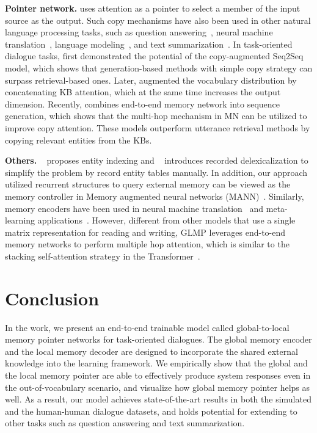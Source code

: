 \documentclass{article} \usepackage{iclr2019_conference,times}
\begin{document}
\textbf{Pointer network.}
\cite{vinyals2015pointer} uses attention as a pointer to select a member of the input source as the output. Such copy mechanisms have also been used in other natural language processing tasks, such as question answering~\citep{Dehghani2017, heEtAl2017Long1}, neural machine translation~\citep{gulcehreEtAl2016,guEtAl2016}, language modeling~\citep{merity2016pointer}, and text summarization~\citep{seeliumanning2017Long}. In task-oriented dialogue tasks, \cite{eric-manning:2017:EACLshort} first demonstrated the potential of the copy-augmented Seq2Seq model, which shows that generation-based methods with simple copy strategy can surpass retrieval-based ones. Later, \cite{ericKVR2017} augmented the vocabulary distribution by concatenating KB attention, which at the same time increases the output dimension. Recently, \cite{mem2seq} combines end-to-end memory network into sequence generation, which shows that the multi-hop mechanism in MN can be utilized to improve copy attention. These models outperform utterance retrieval methods by copying relevant entities from the KBs.

\textbf{Others.}
~\cite{zhao2017generative} proposes entity indexing and ~\cite{dqmem8461426} introduces recorded delexicalization to simplify the problem by record entity tables manually. In addition, our approach utilized recurrent structures to query external memory can be viewed as the memory controller in Memory augmented neural networks (MANN)~\citep{graves2014neural, graves2016hybrid}. Similarly, memory encoders have been used in neural machine translation~\citep{wangEtAl2016} and meta-learning applications~\citep{KaiserNRB17}. However, different from other models that use a single matrix representation for reading and writing, GLMP leverages end-to-end memory networks to perform multiple hop attention, which is similar to the stacking self-attention strategy in the Transformer~\citep{vaswani2017attention}. 


\section{Conclusion}
In the work, we present an end-to-end trainable model called global-to-local memory pointer networks for task-oriented dialogues. The global memory encoder and the local memory decoder are designed to incorporate the shared external knowledge into the learning framework. We empirically show that the global and the local memory pointer are able to effectively produce system responses even in the out-of-vocabulary scenario, and visualize how global memory pointer helps as well. As a result, our model achieves state-of-the-art results in both the simulated and the human-human dialogue datasets, and holds potential for extending to other tasks such as question answering and text summarization.
\end{document}
